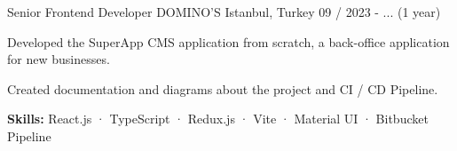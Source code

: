 

\begin{cventries}

\cventry
  {Senior Frontend Developer} %
  {DOMINO'S} %
  {Istanbul, Turkey} %
  {09 / 2023 - ... (1 year)}
  {
    \begin{cvitems} %
      \item {Developed the SuperApp CMS application from scratch, a back-office application for new businesses.}
      \item {Created documentation and diagrams about the project and CI / CD Pipeline.}
      \item {\textbf {Skills:} React.js · TypeScript · Redux.js · Vite · Material UI · Bitbucket Pipeline}
    \end{cvitems}
  }


\end{cventries}
